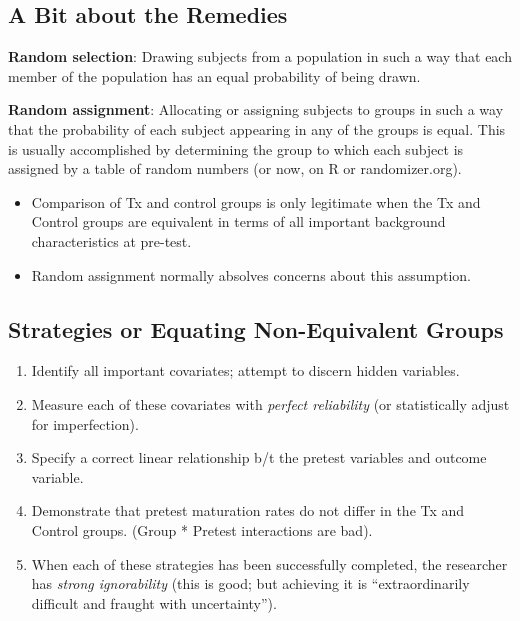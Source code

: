 \documentclass[
  english,
]{book}
\providecommand{\tightlist}{%
  \setlength{\itemsep}{0pt}\setlength{\parskip}{0pt}}
\begin{document}
\hypertarget{a-bit-about-the-remedies}{%
\subsection{A Bit about the Remedies}\label{a-bit-about-the-remedies}}

\textbf{Random selection}: Drawing subjects from a population in such a way that each member of the population has an equal probability of being drawn.

\textbf{Random assignment}: Allocating or assigning subjects to groups in such a way that the probability of each subject appearing in any of the groups is equal. This is usually accomplished by determining the group to which each subject is assigned by a table of random numbers (or now, on R or randomizer.org).

\begin{itemize}
\tightlist
\item
  Comparison of Tx and control groups is only legitimate when the Tx and Control groups are equivalent in terms of all important background characteristics at pre-test.
\item
  Random assignment normally absolves concerns about this assumption.
\end{itemize}

\hypertarget{strategies-or-equating-non-equivalent-groups}{%
\subsection{Strategies or Equating Non-Equivalent Groups}\label{strategies-or-equating-non-equivalent-groups}}

\begin{enumerate}
\def\labelenumi{\arabic{enumi}.}
\tightlist
\item
  Identify all important covariates; attempt to discern hidden variables.
\item
  Measure each of these covariates with \emph{perfect reliability} (or statistically adjust for imperfection).
\item
  Specify a correct linear relationship b/t the pretest variables and outcome variable.
\item
  Demonstrate that pretest maturation rates do not differ in the Tx and Control groups. (Group * Pretest interactions are bad).
\item
  When each of these strategies has been successfully completed, the researcher has \emph{strong ignorability} (this is good; but achieving it is ``extraordinarily difficult and fraught with uncertainty'').
\end{enumerate}
\end{document}
